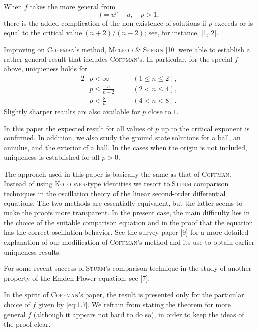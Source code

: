 When $f$ takes the more general from
\begin{equation}\label{eq:1.7}
  f = u^p - u,\quad p>1,
\end{equation}
there is the added complication of the non-existence of solutions if $p$ exceeds
or is equal to the critical value $(n+2)/(n-2)$; see, for instance, [1, 2].

Improving on \textsc{Coffman}'s method, \textsc{Mcleod} \& \textsc{Serrin} [10]
were able to establish a rather general result that includes \textsc{Coffman}'s.
In particular, for the special $f$ above, uniqueness holds for
\begin{alignat*}{2}
  & p<\infty & \quad & (1\leq n\leq 2), \\
  & p \leq \frac{n}{n-2} && (2<n\leq 4), \\
  & p<\frac{8}{n} && (4<n<8).
\end{alignat*}
Slightly sharper reaults are also available for $p$ close to $1$.

In this paper the expected result for all values of $p$ up to the critical exponent
is confirmed. In addition, we also study the ground state solutions for a ball,
an annulus, and the exterior of a ball.
In the cases when the origin is not included, uniqueness is established for all $p>0$.

The approach used in this paper is basically the same as that of \textsc{Coffman}.
Instead of using \textsc{Kolodner}-type identities we resort to \textsc{Sturm} comparison
techniques in the oscillation theory of the linear second-order differential equations.
The two methods are essentially equivalent, but the latter seems to make the proofs
more transparent. In the present case, the main difficulty lies in the choice of the
suitable comparison equation and in the proof that the equation has the correct
oscillation behavior. See the survey paper [9] for a more detailed explanation
of our modification of \textsc{Coffman}'s method and its use to obtain
earlier uniqueness results.

For some recent success of \textsc{Sturm}'s comparison technique in the study
of another property of the Emden-Flower equation, see [7].

In the spirit of \textsc{Coffman}'s paper, the result is presented only for the
particular choice of $f$ given by \eqref{eq:1.7}.
We refrain from stating the theorem for more general $f$
(although it appears not hard to do so), in order to keep the ideas of the proof clear.